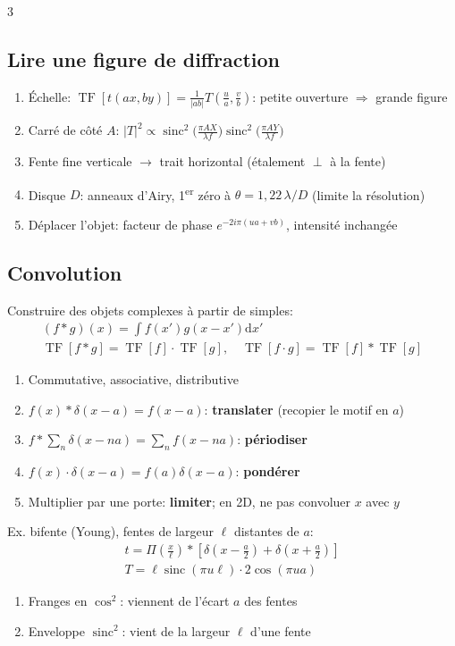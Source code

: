 \documentclass[12pt, a4paper]{article}
\newcommand{\TF}{\operatorname{TF}}
\newcommand{\sinc}{\operatorname{sinc}}
\newcommand{\porte}{\Pi}
\newcommand{\dd}{\mathrm{d}}
\begin{document}
\begin{multicols*}{3}
	\subsection{Lire une figure de diffraction}
	\begin{enumerate}[\roman*.]
		\item Échelle: $\TF[t(ax,by)]=\frac{1}{|ab|}T(\frac ua,\frac vb)$: petite ouverture $\Rightarrow$ grande figure
		\item Carré de côté $A$: $|T|^2\propto\sinc^2\!\big(\frac{\pi AX}{\lambda f}\big)\sinc^2\!\big(\frac{\pi AY}{\lambda f}\big)$
		\item Fente fine verticale $\rightarrow$ trait horizontal (étalement $\perp$ à la fente)
		\item Disque $D$: anneaux d'Airy, 1\textsuperscript{er} zéro à $\theta=1{,}22\,\lambda/D$ (limite la résolution)
		\item Déplacer l'objet: facteur de phase $e^{-2i\pi(ua+vb)}$, intensité inchangée
	\end{enumerate}

	\subsection{Convolution}
	Construire des objets complexes à partir de simples:
	\begin{gather*}
		(f*g)(x)=\int f(x')g(x-x')\dd x'\\
		\TF[f*g]=\TF[f]\cdot\TF[g],\quad\TF[f\cdot g]=\TF[f]*\TF[g]
	\end{gather*}
	\begin{enumerate}[\roman*.]
		\item Commutative, associative, distributive
		\item $f(x)*\delta(x-a)=f(x-a)$: \textbf{translater} (recopier le motif en $a$)
		\item $f*\sum_n\delta(x-na)=\sum_nf(x-na)$: \textbf{périodiser}
		\item $f(x)\cdot\delta(x-a)=f(a)\delta(x-a)$: \textbf{pondérer}
		\item Multiplier par une porte: \textbf{limiter}; en 2D, ne pas convoluer $x$ avec $y$
	\end{enumerate}

	\colbreak
	Ex. bifente (Young), fentes de largeur $\ell$ distantes de $a$:
	\begin{gather*}
		t=\porte(\tfrac x\ell)*[\delta(x-\tfrac a2)+\delta(x+\tfrac a2)]\\
		T=\ell\sinc(\pi u\ell)\cdot2\cos(\pi ua)
	\end{gather*}
	\begin{enumerate}[\roman*.]
		\item Franges en $\cos^2$: viennent de l'écart $a$ des fentes
		\item Enveloppe $\sinc^2$: vient de la largeur $\ell$ d'une fente
	\end{enumerate}


\end{multicols*}
\end{document}
